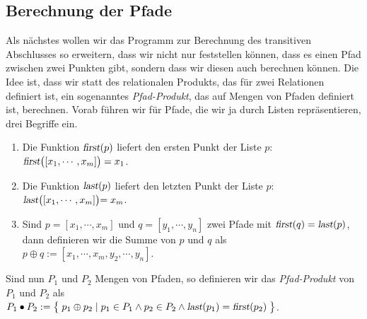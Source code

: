\subsection{Berechnung der Pfade}
Als n\"{a}chstes wollen wir das Programm zur Berechnung des transitiven Abschlusses so
erweitern, dass wir nicht nur feststellen k\"{o}nnen, dass es einen Pfad zwischen zwei Punkten
gibt, sondern dass wir diesen auch berechnen k\"{o}nnen.  Die Idee ist, dass wir statt des
relationalen Produkts, das f\"{u}r zwei Relationen definiert ist, ein sogenanntes
\emph{Pfad-Produkt}, das auf Mengen von Pfaden definiert ist, berechnen.  Vorab f\"{u}hren wir
f\"{u}r Pfade, die wir ja durch Listen repr\"{a}sentieren,
drei Begriffe ein.
\begin{enumerate}
\item Die Funktion $\textsl{first}(p)$ liefert den ersten Punkt der Liste $p$: \\[0.2cm]
      \hspace*{1.3cm} $\textsl{first}\bigl([x_1,\cdots,x_m]\bigr) = x_1$.
\item Die Funktion $\textsl{last}(p)$ liefert den letzten Punkt der Liste $p$: \\[0.2cm]
      \hspace*{1.3cm} $\textsl{last}\bigl([x_1,\cdots,x_m]\bigl) = x_m$.
\item Sind $p = [ x_1, \cdots, x_m ]$ und $q =[ y_1, \cdots, y_n ]$ 
      zwei Pfade mit $\textsl{first}(q) = \textsl{last}(p)$, dann definieren wir 
      die Summe von $p$ und $q$       als \\[0.2cm]
      \hspace*{1.3cm}
      $p \oplus q := [x_1, \cdots, x_m, y_2, \cdots, y_n ]$.
\end{enumerate}
Sind nun $P_1$ und $P_2$ Mengen von Pfaden, so definieren wir das  \emph{Pfad-Produkt} von
$P_1$ und $P_2$ als \\[0.2cm]
\hspace*{1.3cm} 
$P_1 \bullet P_2 := \bigl\{\; p_1 \oplus p_2 \mid p_1 \in P_1 \wedge p_2 \in P_2 \wedge \textsl{last}(p_1) = \textsl{first}(p_2) \;\bigr\}$.


